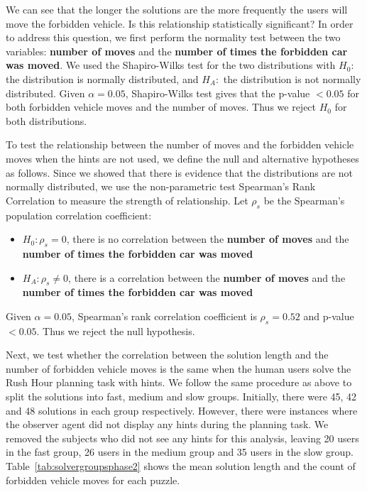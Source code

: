 We can see that the longer the solutions are the more frequently the users will move the forbidden vehicle. 
Is this relationship statistically significant? 
In order to address this question, we first perform the normality test between the two variables: \textbf{number of moves} and the \textbf{number of times the forbidden car was moved}. 
We used the Shapiro-Wilks test for the two distributions with $H_0:$ the distribution is normally distributed, and $H_A:$ the distribution is not normally distributed. Given $\alpha=0.05$, Shapiro-Wilks test gives that the p-value $<0.05$ for both forbidden vehicle moves and the number of moves. 
Thus we reject $H_0$ for both distributions.

To test the relationship between the number of moves and the forbidden vehicle moves when the hints are not used, we define the null and alternative hypotheses as follows. 
Since we showed that there is evidence that the distributions are not normally distributed, we use the non-parametric test Spearman's Rank Correlation to measure the strength of relationship. 
Let $\rho_s$ be the Spearman's population correlation coefficient:
\begin{itemize}
\item $H_0: \rho_s=0$, there is no correlation between the \textbf{number of moves} and the \textbf{number of times the forbidden car was moved}
\item $H_A: \rho_s\neq0$, there is a correlation between the \textbf{number of moves} and the \textbf{number of times the forbidden car was moved}
\end{itemize}
Given $\alpha=0.05$, Spearman's rank correlation coefficient is $\rho_s=0.52$ and p-value $<0.05$. 
Thus we reject the null hypothesis.

Next, we test whether the correlation between the solution length and the number of forbidden vehicle moves is the same when the human users solve the Rush Hour planning task with hints.
We follow the same procedure as above to split the solutions into fast, medium and slow groups.
Initially, there were 45, 42 and 48 solutions in each group respectively.
However, there were instances where the observer agent did not display any hints during the planning task.
We removed the subjects who did not see any hints for this analysis, leaving 20 users in the fast group, 26 users in the medium group and 35 users in the slow group.
Table~\ref{tab:solvergroupsphase2} shows the mean solution length and the count of forbidden vehicle moves for each puzzle.



